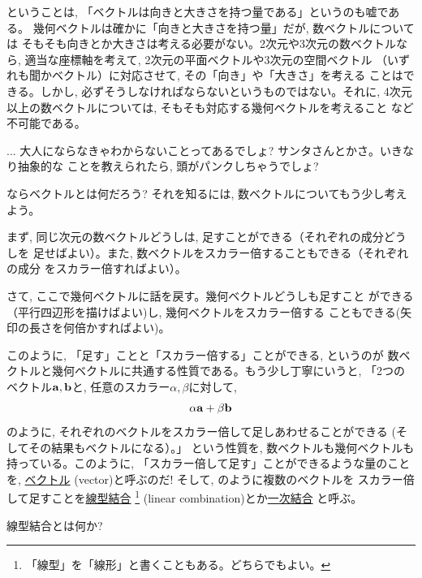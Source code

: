 ということは, 「ベクトルは向きと大きさを持つ量である」というのも嘘である。
幾何ベクトルは確かに「向きと大きさを持つ量」だが, 数ベクトルについては
そもそも向きとか大きさは考える必要がない。2次元や3次元の数ベクトルなら, 
適当な座標軸を考えて, 2次元の平面ベクトルや3次元の空間ベクトル
（いずれも聞かベクトル）に対応させて, その「向き」や「大きさ」を考える
ことはできる。しかし, 必ずそうしなければならないというものではない。それに, 
4次元以上の数ベクトルについては, そもそも対応する幾何ベクトルを考えること
など不可能である。\hv

\begin{faq}{\small{} ... 
大人にならなきゃわからないことってあるでしょ? サンタさんとかさ。いきなり抽象的な
ことを教えられたら, 頭がパンクしちゃうでしょ?}\end{faq}

ならベクトルとは何だろう? それを知るには, 数ベクトルについてもう少し考えよう。

まず, 同じ次元の数ベクトルどうしは, 足すことができる（それぞれの成分どうしを
足せばよい）。また, 数ベクトルをスカラー倍することもできる（それぞれの成分
をスカラー倍すればよい）。\hv

さて, ここで幾何ベクトルに話を戻す。幾何ベクトルどうしも足すこと
ができる（平行四辺形を描けばよい)し, 幾何ベクトルをスカラー倍する
こともできる(矢印の長さを何倍かすればよい)。

このように, 「足す」ことと「スカラー倍する」ことができる, というのが
数ベクトルと幾何ベクトルに共通する性質である。もう少し丁寧にいうと, 
「2つのベクトル${\bf a}, {\bf b}$と, 任意のスカラー$\alpha, \beta$に対して, 
\begin{eqnarray}
\alpha{\bf a}+\beta{\bf b}\label{eq:vect_linconv}
\end{eqnarray}
のように, それぞれのベクトルをスカラー倍して足しあわせることができる
(そしてその結果もベクトルになる）。」
という性質を, 数ベクトルも幾何ベクトルも持っている。このように, 
「スカラー倍して足す」ことができるような量のことを, 
\underline{ベクトル} (vector)と呼ぶのだ!
そして, のように複数のベクトルを
スカラー倍して足すことを\underline{線型結合}
\footnote{「線型」を「線形」と書くこともある。どちらでもよい。}
 (linear combination)とか\underline{一次結合}
と呼ぶ。\hv

\begin{q}\label{q:vect_linconv_def} 線型結合とは何か?\end{q}
\hv


